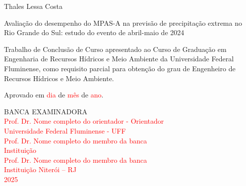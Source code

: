 \documentclass[12pt,a4paper,oneside]{book}
\begin{document}
\begin{center}
Thales Lessa Costa

\vspace{1cm}
Avaliação do desempenho do MPAS-A na previsão de precipitação extrema no Rio Grande do Sul: estudo do evento de abril-maio de 2024

\vspace{1cm}
\begin{flushright}
\begin{minipage}{0.55\textwidth}
Trabalho de Conclusão de Curso apresentado ao Curso de Graduação em Engenharia de Recursos Hídricos e Meio Ambiente da Universidade Federal Fluminense, como requisito parcial para obtenção do grau de Engenheiro de Recursos Hídricos e Meio Ambiente.
\end{minipage}
\end{flushright}

\vfill
\begin{flushleft}
Aprovado em \textcolor{red}{dia} de \textcolor{red}{mês} de \textcolor{red}{ano}.
\end{flushleft}
\vfill
BANCA EXAMINADORA
\vfill
\hrulefill\\
\textcolor{red}{Prof. Dr. Nome completo do orientador - Orientador}\\
\textcolor{red}{Universidade Federal Fluminense - UFF}
\vfill
\hrulefill\\
\textcolor{red}{Prof. Dr. Nome completo do membro da banca}\\
\textcolor{red}{Instituição}
\vfill
\hrulefill\\
\textcolor{red}{Prof. Dr. Nome completo do membro da banca}\\
\textcolor{red}{Instituição}
\vfill
\textcolor{red}{Niterói -- RJ}\\
\textcolor{red}{2025}
\end{center}
\pagebreak
\end{document}
